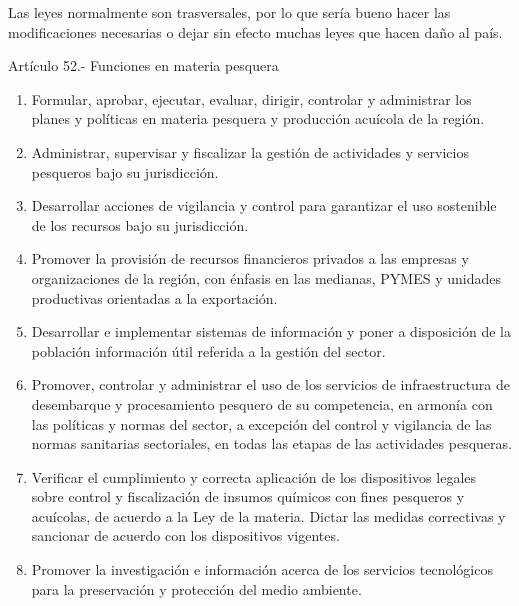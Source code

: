 \documentclass[
  a4paper,
]{article}
\providecommand{\tightlist}{%
  \setlength{\itemsep}{0pt}\setlength{\parskip}{0pt}}\usepackage{longtable,booktabs,array}
\begin{document}
Las leyes normalmente son trasversales, por lo que sería bueno hacer las
modificaciones necesarias o dejar sin efecto muchas leyes que hacen daño
al país.

Artículo 52.- Funciones en materia pesquera

\begin{enumerate}
\def\labelenumi{\alph{enumi})}
\tightlist
\item
  Formular, aprobar, ejecutar, evaluar, dirigir, controlar y administrar
  los planes y políticas en materia pesquera y producción acuícola de la
  región.
\item
  Administrar, supervisar y fiscalizar la gestión de actividades y
  servicios pesqueros bajo su jurisdicción.
\item
  Desarrollar acciones de vigilancia y control para garantizar el uso
  sostenible de los recursos bajo su jurisdicción.
\item
  Promover la provisión de recursos financieros privados a las empresas
  y organizaciones de la región, con énfasis en las medianas, PYMES y
  unidades productivas orientadas a la exportación.
\item
  Desarrollar e implementar sistemas de información y poner a
  disposición de la población información útil referida a la gestión del
  sector.
\item
  Promover, controlar y administrar el uso de los servicios de
  infraestructura de desembarque y procesamiento pesquero de su
  competencia, en armonía con las políticas y normas del sector, a
  excepción del control y vigilancia de las normas sanitarias
  sectoriales, en todas las etapas de las actividades pesqueras.
\item
  Verificar el cumplimiento y correcta aplicación de los dispositivos
  legales sobre control y fiscalización de insumos químicos con fines
  pesqueros y acuícolas, de acuerdo a la Ley de la materia. Dictar las
  medidas correctivas y sancionar de acuerdo con los dispositivos
  vigentes.
\item
  Promover la investigación e información acerca de los servicios
  tecnológicos para la preservación y protección del medio ambiente.
\end{enumerate}
\end{document}
